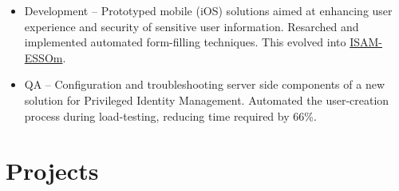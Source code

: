\begin{itemize}
  \begin{itemize}
  \tightlist
  \item
    Development -- Prototyped mobile (iOS) solutions aimed at enhancing
    user experience and security of sensitive user information.
    Resarched and implemented automated form-filling techniques. This
    evolved into
    \href{https://itunes.apple.com/us/app/isam-essom/id741972716?mt=8}{ISAM-ESSOm}.
  \item
    QA -- Configuration and troubleshooting server side components of a
    new solution for Privileged Identity Management. Automated the
    user-creation process during load-testing, reducing time required by
    66\%.
  \end{itemize}
\end{itemize}

\section{Projects}\label{projects}

